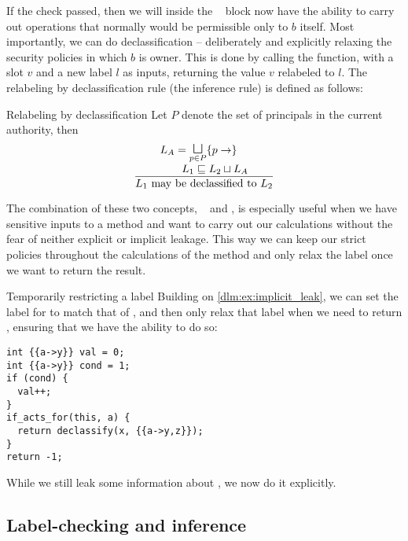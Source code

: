 If the check passed, then we will inside the \dlmactsfor~ block now have the ability to carry out operations that normally would be permissible only to $b$ itself.
Most importantly, we can do declassification -- deliberately and explicitly relaxing the security policies in which $b$ is owner.
This is done by calling the \dlmdeclassify{} function, with a slot $v$ and a new label $l$ as inputs, returning the value $v$ relabeled to $l$.
The relabeling by declassification rule (the inference rule) is defined as follows:

\begin{definition}{Relabeling by declassification}
  Let $P$ denote the set of principals in the current authority, then
  \[
  \frac
  {
    \splitfrac
    {
      L_A = \mathlarger\sqcupl_{p \in P} \{p \rightarrow \}
    }
    {
      L_1 \sqsubseteq L_2 \sqcup L_A
    }
  }
  {
    L_1 \text{ may be declassified to } L_2
  }
  \]
\end{definition}

The combination of these two concepts, \dlmactsfor~ and \dlmdeclassify, is especially useful when we have sensitive inputs to a method and want to carry out our calculations without the fear of neither explicit or implicit leakage.
This way we can keep our strict policies throughout the calculations of the method and only relax the label once we want to return the result.

\begin{example}{Temporarily restricting a label}
  Building on \cref{dlm:ex:implicit_leak}, we can set the label for  to match that of , and then only relax that label when we need to return , ensuring that we have the ability to do so:
  \begin{lstlisting}[style=dlmc]
int {{a->y}} val = 0;
int {{a->y}} cond = 1;
if (cond) {
  val++;
}
if_acts_for(this, a) {
  return declassify(x, {{a->y,z}});
}
return -1;
  \end{lstlisting}
  While we still leak some information about , we now do it explicitly.
\end{example}

\subsection{Label-checking and inference}
